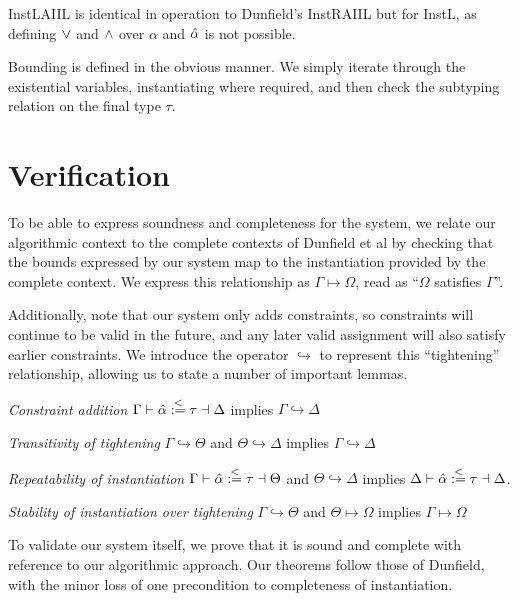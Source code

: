 \documentclass{sig-alternate}
\begin{document}
InstLAIIL is identical in operation to Dunfield's InstRAIIL but for InstL, as defining $\vee$ and $\wedge$ over $\alpha$ and $\hat{\alpha}$ is not possible.
\begin{figure}[h]
\small

\end{figure}

Bounding is defined in the obvious manner. We simply iterate through the existential variables, instantiating where required, and then check the subtyping relation on the final type $\tau$.

\begin{figure}[h]
\small

\end{figure}

\section{Verification}

To be able to express soundness and completeness for the system, we relate our algorithmic context to the complete contexts of Dunfield et al by checking that the bounds expressed by our system map to the instantiation provided by the complete context. We express this relationship as $\Gamma \mapsto \Omega$, read as ``$\Omega$ satisfies $\Gamma$''.




Additionally, note that our system only adds constraints, so constraints will continue to be valid in the future, and any later valid assignment will also satisfy earlier constraints. We introduce the operator $\hookrightarrow$ to represent this ``tightening'' relationship, allowing us to state a number of important lemmas.

\emph{Constraint addition} $\Gamma \vdash \hat{\alpha} \overset{<}{:=} \tau \dashv \Delta$ implies $\Gamma \hookrightarrow \Delta$

\emph{Transitivity of tightening} $\Gamma \hookrightarrow \Theta$ and $\Theta \hookrightarrow \Delta$ implies $\Gamma \hookrightarrow \Delta$

\emph{Repeatability of instantiation} $\Gamma \vdash \hat{\alpha} \overset{<}{:=} \tau \dashv \Theta$ and $\Theta \hookrightarrow \Delta$ implies $\Delta \vdash \hat{\alpha} \overset{<}{:=} \tau \dashv \Delta$.

\emph{Stability of instantiation over tightening} $\Gamma \hookrightarrow \Theta$ and $\Theta \mapsto \Omega$ implies $\Gamma \mapsto \Omega$



To validate our system itself, we prove that it is sound and complete with reference to our algorithmic approach. Our theorems follow those of Dunfield, with the minor loss of one precondition to completeness of instantiation.
\end{document}
